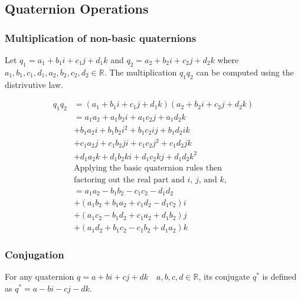 \documentclass[12pt, a4paper]{article}
\begin{document}
\subsection{Quaternion Operations}
\subsubsection{Multiplication of non-basic quaternions}
Let $q_1 = a_1 + b_1i + c_1j + d_1k$ and $q_2 = a_2 + b_2i + c_2j + d_2k$ where
$a_1, b_1, c_1, d_1, a_2, b_2, c_2, d_2 \in \mathbb{R}$. The multiplication
$q_1q_2$ can be computed using the distrivutive law.

\begin{align*}
    q_1q_2 & = (a_1 + b_1i + c_1j + d_1k)(a_2 + b_2i + c_2j + d_2k)    \\
           & = a_1a_2 + a_1b_2i + a_1c_2j + a_1d_2k                    \\
           & + b_1a_2i + b_1b_2i^2 + b_1c_2ij + b_1d_2ik               \\
           & + c_1a_2j + c_1b_2ji + c_1c_2j^2 + c_1d_2jk               \\
           & + d_1a_2k + d_1b_2ki + d_1c_2kj + d_1d_2k^2               \\
           & \text{Applying the basic quaternion rules then}           \\
           & \text{factoring out the real part and $i$, $j$, and $k$,} \\
           & = a_1a_2 - b_1b_2 - c_1c_2 - d_1d_2                       \\
           & + (a_1b_2 + b_1a_2 + c_1d_2 - d_1c_2)i                    \\
           & + (a_1c_2 - b_1d_2 + c_1a_2 + d_1b_2)j                    \\
           & + (a_1d_2 + b_1c_2 - c_1b_2 + d_1a_2)k
\end{align*}

\subsubsection{Conjugation}
For any quaternion $q = a + bi + cj + dk \quad a, b, c, d \in \mathbb{R}$, its
conjugate $q^*$ is defined as $q^* = a - bi - cj - dk$. \\
\end{document}
